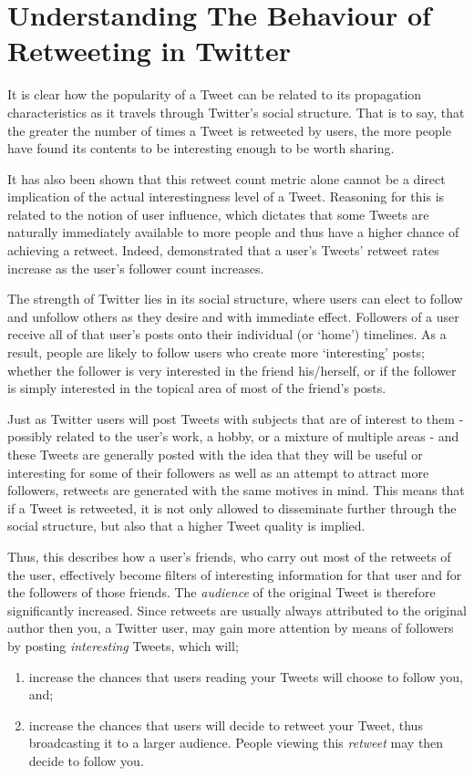 \chapter{Understanding The Behaviour of Retweeting in Twitter}


It is clear how the popularity of a Tweet can be related to its propagation characteristics as it travels through Twitter's social structure. That is to say, that the greater the number of times a Tweet is retweeted by users, the more people have found its contents to be interesting enough to be worth sharing.

It has also been shown that this retweet count metric alone cannot be a direct implication of the actual interestingness level of a Tweet. Reasoning for this is related to the notion of user influence, which dictates that some Tweets are naturally immediately available to more people and thus have a higher chance of achieving a retweet. Indeed, \citet{suh10} demonstrated that a user's Tweets' retweet rates increase as the user's follower count increases.

The strength of Twitter lies in its social structure, where users can elect to follow and unfollow others as they desire and with immediate effect. Followers of a user receive all of that user's posts onto their individual (or `home') timelines. As a result, people are likely to follow users who create more `interesting' posts; whether the follower is very interested in the friend his/herself, or if the follower is simply interested in the topical area of most of the friend's posts. 

Just as Twitter users will post Tweets with subjects that are of interest to them - possibly related to the user's work, a hobby, or a mixture of multiple areas - and these Tweets are generally posted with the idea that they will be useful or interesting for some of their followers as well as an attempt to attract more followers, retweets are generated with the same motives in mind. This means that if a Tweet is retweeted, it is not only allowed to disseminate further through the social structure, but also that a higher Tweet quality is implied.

Thus, this describes how a user's friends, who carry out most of the retweets of the user, effectively become filters of interesting information for that user and for the followers of those friends. The \textit{audience} of the original Tweet is therefore significantly increased. Since retweets are usually always attributed to the original author then you, a Twitter user, may gain more attention by means of followers by posting \textit{interesting} Tweets, which will; 
\begin{enumerate}
\item increase the chances that users reading your Tweets will choose to follow you, and;
\item increase the chances that users will decide to retweet your Tweet, thus broadcasting it to a larger audience. People viewing this \textit{retweet} may then decide to follow you. 
\end{enumerate}

